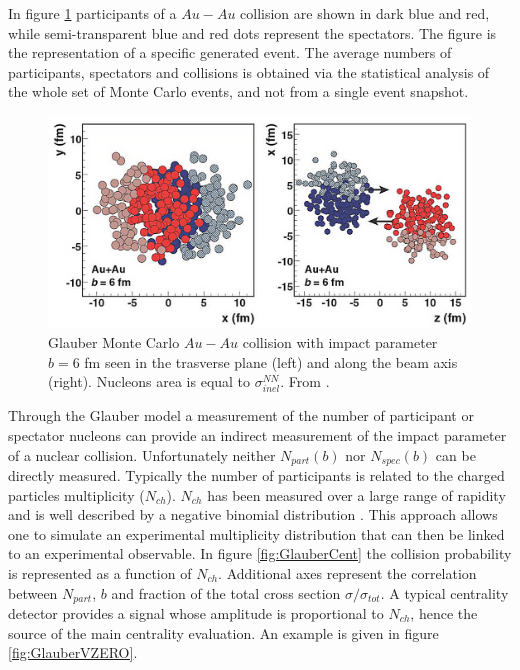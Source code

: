 In figure \ref{fig:GlauberAuAu} participants of a $Au-Au$ collision are shown in dark blue and red, while semi-transparent blue and red dots represent the spectators.
The figure is the representation of a specific generated event.
The average numbers of participants, spectators and collisions is obtained via the statistical analysis of the whole set of Monte Carlo events, and not from a single event snapshot.

\begin{figure}[!t]
\begin{center}
\includegraphics[width=0.9\linewidth]{Chapters/Analysis/Figs/glauber-pbpb.pdf}
\caption{Glauber Monte Carlo $Au-Au$ collision with impact parameter $b=6$ fm seen in the trasverse plane (left) and along the beam axis (right). Nucleons area is equal to $\sigma_{inel}^{NN}$. From \cite{Miller:2007ri}.}
\label{fig:GlauberAuAu}
\end{center}
\end{figure}

Through the Glauber model a measurement of the number of participant or spectator nucleons can provide an indirect measurement of the impact parameter of a nuclear collision.
Unfortunately neither $N_{part}(b)$ nor $N_{spec}(b)$ can be directly measured.
Typically the number of participants is related to the charged particles multiplicity ($N_{ch}$).
$N_{ch}$ has been measured over a large range of rapidity and is well described by a negative binomial distribution \cite{Aamodt:2009aa}.
This approach allows one to simulate an experimental multiplicity distribution that can then be linked to an experimental observable.
In figure \ref{fig:GlauberCent} the collision probability is represented as a function of $N_{ch}$. Additional axes represent the correlation between $N_{part}$, $b$ and fraction of the total cross section $\sigma/\sigma_{tot}$.
A typical centrality detector provides a signal whose amplitude is proportional to $N_{ch}$, hence the source of the main centrality evaluation.
An example is given in figure \ref{fig:GlauberVZERO}.


